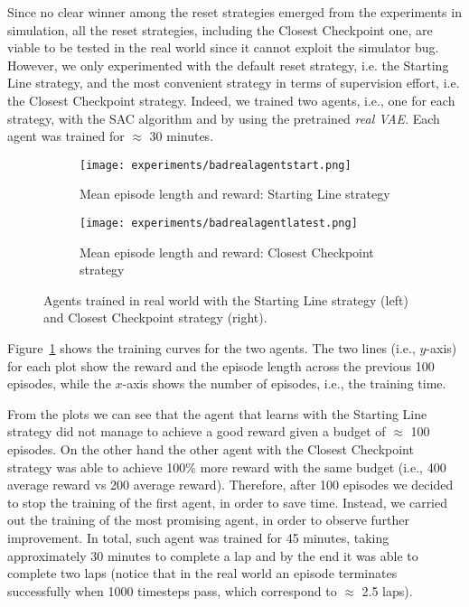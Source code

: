Since no clear winner among the reset strategies emerged from the experiments in simulation, all the reset strategies, including the Closest Checkpoint one, are viable to be tested in the real world since it cannot exploit the simulator bug. However, we only experimented with the default reset strategy, i.e. the Starting Line strategy, and the most convenient strategy in terms of supervision effort, i.e. the Closest Checkpoint strategy. Indeed, we trained two agents, i.e., one for each strategy, with the SAC algorithm and by using the pretrained \textit{real VAE}. Each agent was trained for $\approx$ 30 minutes.

\begin{figure}[h]
	\centering
	\begin{subfigure}{.5\linewidth}
		\centering
		\texttt{[image: experiments/badrealagentstart.png]}
		\caption{Mean episode length and reward: Starting Line strategy}\label{fig:rlen}
	\end{subfigure}%
	\hfill
	\begin{subfigure}{.5\linewidth}
		\centering
		\texttt{[image: experiments/badrealagentlatest.png]}
		\caption{Mean episode length and reward: Closest Checkpoint strategy}\label{fig:rrew}
	\end{subfigure}
	\caption{Agents trained in real world with the Starting Line strategy (left) and Closest Checkpoint strategy (right).}
	\label{fig:realresult}
\end{figure}

Figure~\ref{fig:rlen} shows the training curves for the two agents. The two lines (i.e., $y$-axis) for each plot show the reward and the episode length across the previous 100 episodes, while the $x$-axis shows the number of episodes, i.e., the training time.

From the plots we can see that the agent that learns with the Starting Line strategy did not manage to achieve a good reward given a budget of $\approx$ 100 episodes. On the other hand the other agent with the Closest Checkpoint strategy was able to achieve 100\% more reward with the same budget (i.e., 400 average reward vs 200 average reward). Therefore, after 100 episodes we decided to stop the training of the first agent, in order to save time. Instead, we carried out the training of the most promising agent, in order to observe further improvement. In total, such agent was trained for 45 minutes, taking approximately 30 minutes to complete a lap and by the end it was able to complete two laps (notice that in the real world an episode terminates successfully when 1000 timesteps pass, which correspond to $\approx$ 2.5 laps).

